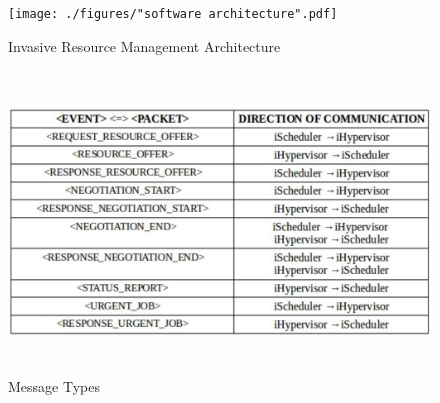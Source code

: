 \begin{figure}[!htbp]
\centering
\texttt{[image: ./figures/"software architecture".pdf]}
\caption{Invasive Resource Management Architecture}
\label{fig:7}
\end{figure}
\begin{figure}[h]
\centering
\includegraphics[width=1.0\textwidth, height=80mm]{./figures/table.pdf}
\caption{Message Types}
\label{fig:8}
\end{figure}

